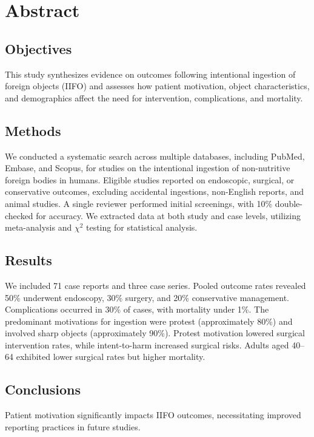 \section*{Abstract}

\subsection{Objectives} This study synthesizes evidence on outcomes following intentional ingestion of foreign objects (IIFO) and assesses how patient motivation, object characteristics, and demographics affect the need for intervention, complications, and mortality.

\subsection{Methods} We conducted a systematic search across multiple databases, including PubMed, Embase, and Scopus, for studies on the intentional ingestion of non-nutritive foreign bodies in humans. Eligible studies reported on endoscopic, surgical, or conservative outcomes, excluding accidental ingestions, non-English reports, and animal studies. A single reviewer performed initial screenings, with 10\% double-checked for accuracy. We extracted data at both study and case levels, utilizing meta-analysis and $\chi^2$ testing for statistical analysis.

\subsection{Results} We included 71 case reports and three case series. Pooled outcome rates revealed 50\% underwent endoscopy, 30\% surgery, and 20\% conservative management. Complications occurred in 30\% of cases, with mortality under 1\%. The predominant motivations for ingestion were protest (approximately 80\%) and involved sharp objects (approximately 90\%). Protest motivation lowered surgical intervention rates, while intent-to-harm increased surgical risks. Adults aged 40--64 exhibited lower surgical rates but higher mortality.

\subsection{Conclusions} Patient motivation significantly impacts IIFO outcomes, necessitating improved reporting practices in future studies.